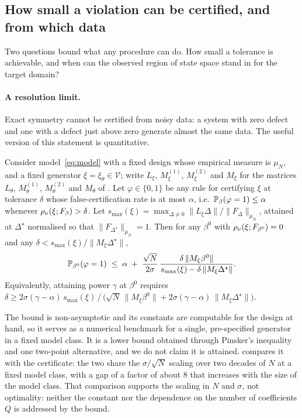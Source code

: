 \subsection{How small a violation can be certified, and from which data}
\label{sec:limits}

Two questions bound what any procedure can do. How small a tolerance is
achievable, and when can the observed region of state space stand in for the
target domain?

\paragraph{A resolution limit.} Exact symmetry cannot be certified from noisy
data: a system with zero defect and one with a defect just above zero generate
almost the same data. The useful version of this statement is quantitative.

\begin{proposition}
\label{prop:lecam}
Consider model~\eqref{eq:model} with a fixed design whose empirical measure is
$\mu_N$, and a fixed generator $\xi = \xi_\theta \in \mathcal V$; write
$L_\xi$, $M^{(1)}_\xi$, $M^{(2)}_\xi$ and $M_\xi$ for the matrices $L_\theta$,
$M^{(1)}_\theta$, $M^{(2)}_\theta$ and $M_\theta$ of .
Let $\varphi \in \{0,1\}$ be any rule
for certifying $\xi$ at tolerance $\delta$ whose false-certification rate is at
most $\alpha$, i.e.\ $\mathbb{P}_\beta(\varphi = 1) \le \alpha$ whenever
$\rho_\nu(\xi;F_\beta) > \delta$. Let $s_{\max}(\xi) = \max_{\Delta \neq 0}
\|L_\xi \Delta\|/\|F_\Delta\|_{\mu_N}$, attained at $\Delta^\star$ normalised
so that $\|F_{\Delta^\star}\|_{\mu_N} = 1$. Then for any $\beta^0$ with
$\rho_\nu(\xi;F_{\beta^0}) = 0$ and any $\delta < s_{\max}(\xi)/\|M_\xi
\Delta^\star\|$,
\begin{equation}
  \mathbb{P}_{\beta^0}(\varphi = 1)
  \;\le\; \alpha \;+\; \frac{\sqrt{N}}{2\sigma}\,
  \frac{\delta\,\|M_\xi \beta^0\|}{s_{\max}(\xi) - \delta\,\|M_\xi\Delta^\star\|} .
  \label{eq:lecam}
\end{equation}
Equivalently, attaining power $\gamma$ at $\beta^0$ requires
$\delta \ge 2\sigma(\gamma-\alpha)\,s_{\max}(\xi)\,/\,
\bigl(\sqrt{N}\,\|M_\xi\beta^0\| + 2\sigma(\gamma-\alpha)\,\|M_\xi\Delta^\star\|\bigr)$.
\end{proposition}

The bound is non-asymptotic and its constants are computable for the design at
hand, so it serves as a numerical benchmark for a single, pre-specified
generator in a fixed model class. It is a lower bound obtained through
Pinsker's inequality and one two-point alternative, and we do not claim it is
attained.  compares it with the certificate: the two share
the $\sigma/\sqrt N$ scaling over two decades of $N$ at a fixed model class,
with a gap of a factor of about $8$ that increases with the size of the model
class. That comparison supports the scaling in $N$ and $\sigma$, not
optimality: neither the constant nor the dependence on the number of
coefficients $Q$ is addressed by the bound.

